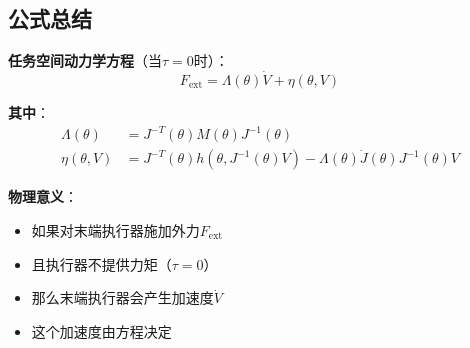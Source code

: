 \documentclass[12pt,a4paper]{article}
\begin{document}
\subsection{公式总结}

\textbf{任务空间动力学方程}（当$\tau = 0$时）：
\begin{equation}
F_{\text{ext}} = \Lambda(\theta)\dot{V} + \eta(\theta, V)
\end{equation}

\textbf{其中}：
\begin{align}
\Lambda(\theta) &= J^{-T}(\theta)M(\theta)J^{-1}(\theta) \\
\eta(\theta, V) &= J^{-T}(\theta)h(\theta, J^{-1}(\theta)V) - \Lambda(\theta)\dot{J}(\theta)J^{-1}(\theta)V
\end{align}

\textbf{物理意义}：
\begin{itemize}
\item 如果对末端执行器施加外力$F_{\text{ext}}$
\item 且执行器不提供力矩（$\tau = 0$）
\item 那么末端执行器会产生加速度$\dot{V}$
\item 这个加速度由方程决定
\end{itemize}
\end{document}
